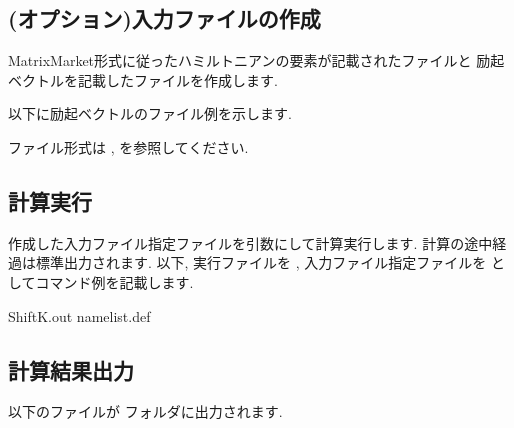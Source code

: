 \documentclass[letterpaper,10pt,dvipdfmx,openany]{sphinxmanual}
\begin{document}
\subsection{(オプション)入力ファイルの作成}
\label{\detokenize{shiftk_flow_ja:id5}}
MatrixMarket形式に従ったハミルトニアンの要素が記載されたファイルと
励起ベクトルを記載したファイルを作成します.

以下に励起ベクトルのファイル例を示します.

\begin{sphinxVerbatim}[commandchars=\\\{\}]
    
    
     
 
\end{sphinxVerbatim}

ファイル形式は {\hyperref[\detokenize{shiftk_format_ja:ham}]{}}, {\hyperref[\detokenize{shiftk_format_ja:vec}]{}} を参照してください.


\subsection{計算実行}
\label{\detokenize{shiftk_flow_ja:id6}}
作成した入力ファイル指定ファイルを引数にして計算実行します.
計算の途中経過は標準出力されます. 以下, 実行ファイルを  ,
入力ファイル指定ファイルを  としてコマンド例を記載します.

\begin{sphinxVerbatim}[commandchars=\\\{\}]
\PYGZdl{} ShiftK.out namelist.def
\end{sphinxVerbatim}


\subsection{計算結果出力}
\label{\detokenize{shiftk_flow_ja:id7}}
以下のファイルが  フォルダに出力されます.

\begin{sphinxVerbatim}[commandchars=\\\{\}]
  
\end{sphinxVerbatim}
\end{document}
